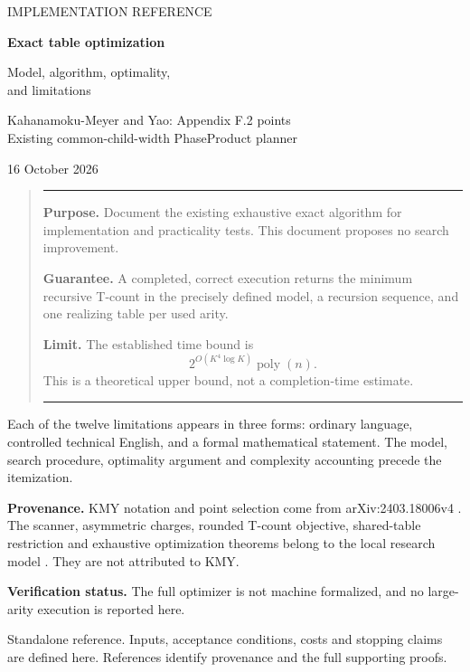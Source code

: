 \documentclass[11pt,letterpaper]{article}
\newenvironment{scopebox}{\begin{quote}\small\color{navy}\hrule\vspace{6pt}}{\vspace{6pt}\hrule\end{quote}}
\begin{document}
\hypersetup{pageanchor=false}
\begin{titlepage}
\vspace*{0.45in}
{\large\color{teal}IMPLEMENTATION REFERENCE\par}
\vspace{0.25in}
{\Huge\bfseries\color{navy}Exact table optimization\par}
\vspace{0.15in}
{\LARGE Model, algorithm, optimality,\\and limitations\par}
\vspace{0.35in}
{\large Kahanamoku-Meyer and Yao: Appendix F.2 points\\
Existing common-child-width PhaseProduct planner\par}
\vspace{0.25in}16 October 2026
\vspace{0.3in}
\begin{scopebox}
\textbf{Purpose.} Document the existing exhaustive exact algorithm for implementation and practicality tests. This document proposes no search improvement.

\textbf{Guarantee.} A completed, correct execution returns the minimum recursive T-count in the precisely defined model, a recursion sequence, and one realizing table per used arity.

\textbf{Limit.} The established time bound is
\[
2^{O(K^4\log K)}\operatorname{poly}(n).
\]
This is a theoretical upper bound, not a completion-time estimate.
\end{scopebox}
Each of the twelve limitations appears in three forms: ordinary language,
controlled technical English, and a formal mathematical statement.
The model, search procedure, optimality argument and complexity
accounting precede the itemization.

\textbf{Provenance.} KMY notation and point selection come from
arXiv:2403.18006v4 \cite{kmy}. The scanner, asymmetric charges, rounded
T-count objective, shared-table restriction and exhaustive optimization
theorems belong to the local research model \cite{threshold,outer,profile}.
They are not attributed to KMY.

\textbf{Verification status.} The full optimizer is not
machine formalized, and no large-arity execution is reported here.

\vfill
{\small\color{graytext}Standalone reference. Inputs, acceptance conditions, costs and stopping claims are defined here. References identify provenance and the full supporting proofs.}
\end{titlepage}
\hypersetup{pageanchor=true}
\begingroup
\small
\setlength{\parskip}{0pt}
\tableofcontents
\endgroup
\clearpage
{}
\end{document}
